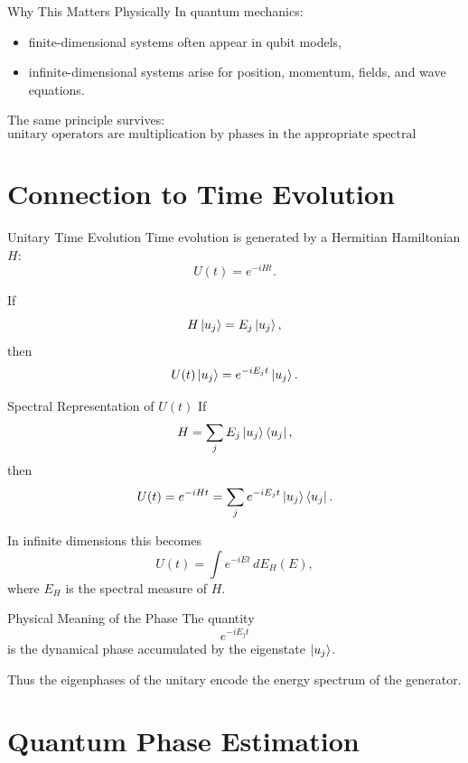\documentclass{beamer}
\begin{document}
\begin{frame}{Why This Matters Physically}
In quantum mechanics:
\begin{itemize}
\item finite-dimensional systems often appear in qubit models,
\item infinite-dimensional systems arise for position, momentum, fields, and wave equations.
\end{itemize}

The same principle survives:
\[
\text{unitary operators are multiplication by phases in the appropriate spectral representation.}
\]
\end{frame}

\section{Connection to Time Evolution}

\begin{frame}{Unitary Time Evolution}
Time evolution is generated by a Hermitian Hamiltonian \(H\):
\[
U(t)=e^{-iHt}.
\]

If
\[
H\ket{u_j}=E_j\ket{u_j},
\]
then
\[
U(t)\ket{u_j}=e^{-iE_j t}\ket{u_j}.
\]
\end{frame}

\begin{frame}{Spectral Representation of \(U(t)\)}
If
\[
H=\sum_j E_j \ket{u_j}\bra{u_j},
\]
then
\[
U(t)=e^{-iHt}
=\sum_j e^{-iE_j t}\ket{u_j}\bra{u_j}.
\]

In infinite dimensions this becomes
\[
U(t)=\int e^{-iEt}\, dE_H(E),
\]
where \(E_H\) is the spectral measure of \(H\).
\end{frame}

\begin{frame}{Physical Meaning of the Phase}
The quantity
\[
e^{-iE_j t}
\]
is the dynamical phase accumulated by the eigenstate \(\ket{u_j}\).

Thus the eigenphases of the unitary encode the energy spectrum of the generator.
\end{frame}

\section{Quantum Phase Estimation}
\end{document}
